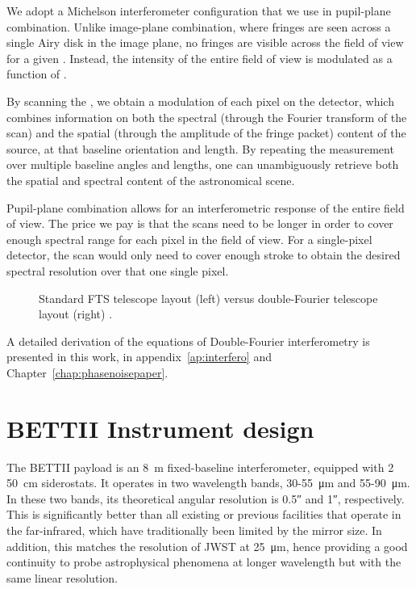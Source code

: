 We adopt a Michelson interferometer configuration that we use in pupil-plane combination. Unlike image-plane combination, where fringes are seen across a single Airy disk in the image plane, no fringes are visible across the field of view for a given \OPD. Instead, the intensity of the entire field of view is modulated as a function of \OPD. 

By scanning the \OPD, we obtain a modulation of each pixel on the detector, which combines information on both the spectral (through the Fourier transform of the scan) and the spatial (through the amplitude of the fringe packet) content of the source, at that baseline orientation and length. By repeating the measurement over multiple baseline angles and lengths, one can unambiguously retrieve both the spatial and spectral content of the astronomical scene. 

Pupil-plane combination allows for an interferometric response of the entire field of view. The price we pay is that the \OPD scans need to be longer in order to cover enough spectral range for each pixel in the field of view. For a single-pixel detector, the \OPD scan would only need to cover enough stroke to obtain the desired spectral resolution over that one single pixel.



\begin{figure}[!ht]
	\centering
	
	\caption[FTS vs Double-Fourier]{Standard FTS telescope layout (left) versus double-Fourier telescope layout (right) \citep{Mariotti:1988vea}.}
	\label{fig:FTSvsDoubleFourier}
    \end{figure}

A detailed derivation of the equations of Double-Fourier interferometry is presented in this work, in appendix~\ref{ap:interfero} and Chapter~\ref{chap:phasenoisepaper}.

\section{BETTII Instrument design}



The BETTII payload is an \SI{8}{\meter} fixed-baseline interferometer, equipped with 2 \SI{50}{\centi\meter} siderostats. It operates in two wavelength bands, 30-55~\si{\micro\meter} and 55-90~\si{\micro\meter}. In these two bands, its theoretical angular resolution is \ang{;;0.5} and \ang{;;1}, respectively. This is significantly better than all existing or previous facilities that operate in the far-infrared, which have traditionally been limited by the mirror size. In addition, this matches the resolution of JWST at \SI{25}{\micro\meter}, hence providing a good continuity to probe astrophysical phenomena at longer wavelength but with the same linear resolution.

